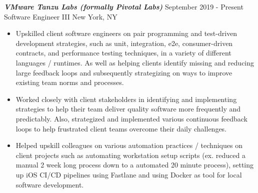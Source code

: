 {\sl \textbf{VMware Tanzu Labs (formally Pivotal Labs)}} \hfill September 2019 - Present \\ Software Engineer III \hfill New York, NY
\begin{itemize}
    \item Upskilled client software engineers on pair programming and test-driven development strategies, such as unit, integration, e2e, consumer-driven contracts, and performance testing techniques, in a variety of different languages / runtimes. As well as helping clients identify missing and reducing large feedback loops and subsequently strategizing on ways to improve existing team norms and processes.
    \item Worked closely with client stakeholders in identifying and implementing  strategies to help their team deliver quality software more frequently and predictably. Also, strategized and implemented various continuous feedback loops to help frustrated client teams overcome their daily challenges.
    \item Helped upskill colleagues on various automation practices / techniques on client projects such as automating workstation setup scripts (ex. reduced a manual 2 week long process down to a automated 20 minute process), setting up iOS CI/CD pipelines using Fastlane and using Docker as tool for local software development.
\end{itemize}

